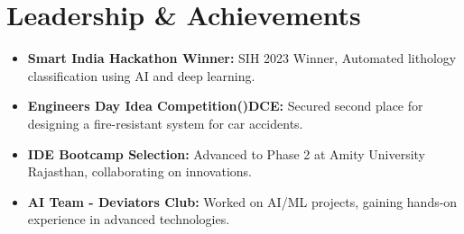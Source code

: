 \documentclass[letterpaper,11pt]{article}
\newcommand{\resumeItem}[1]{
  \item\small{
    {#1 \vspace{-2pt}}
  }
}
\newcommand{\resumeSubHeadingListStart}{\begin{itemize}[leftmargin=0.0in, label={}]}
\newcommand{\resumeSubHeadingListEnd}{\end{itemize}}
\begin{document}
\section{Leadership \& Achievements}
\resumeSubHeadingListStart
  \resumeItem{\textbf{Smart India Hackathon Winner:} SIH 2023 Winner, Automated lithology classification using AI and deep learning.}
  \resumeItem{\textbf{Engineers Day Idea Competition()DCE:} Secured second place for designing a fire-resistant system for car accidents.}
  \resumeItem{\textbf{IDE Bootcamp Selection:} Advanced to Phase 2 at Amity University Rajasthan, collaborating on innovations.}
  \resumeItem{\textbf{AI Team - Deviators Club:} Worked on AI/ML projects, gaining hands-on experience in advanced technologies.}
\resumeSubHeadingListEnd
\end{document}
